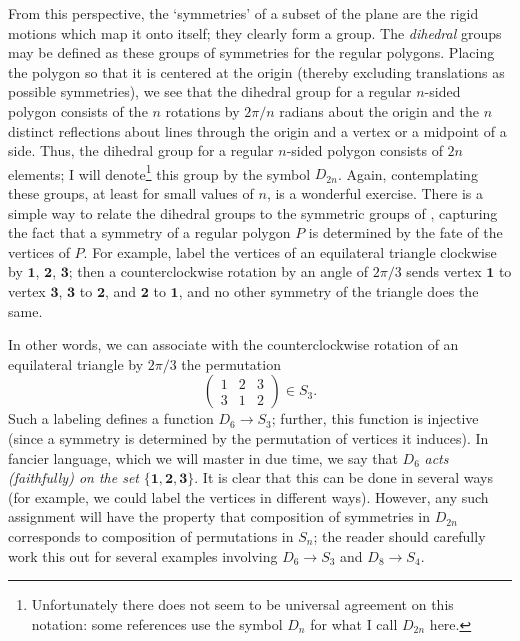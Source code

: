 From this perspective, the `symmetries' of a subset of the plane are
the rigid motions which map it onto itself; they clearly form a group.
The \textit{dihedral} groups may be defined as these groups of
symmetries for the regular polygons. Placing the polygon so that it is
centered at the origin (thereby excluding translations as possible
symmetries), we see that the dihedral group for a regular $n$-sided
polygon consists of the $n$ rotations by $2\pi/n$ radians about the
origin and the $n$ distinct reflections about lines through the origin
and a vertex or a midpoint of a side. Thus, the dihedral group for a
regular $n$-sided polygon consists of $2n$ elements; I will
denote\footnote{Unfortunately there does not seem to be universal
  agreement on this notation: some references use the symbol $D_n$ for
  what I call $D_{2n}$ here.} this group by the symbol $D_{2n}$.
Again, contemplating these groups, at least for small values of $n$,
is a wonderful exercise. There is a simple way to relate the dihedral
groups to the symmetric groups of
, capturing the fact that a
symmetry of a regular polygon $P$ is determined by the fate of the
vertices of $P$. For example, label the vertices of an equilateral
triangle clockwise by $\mathbf{1}$, $\mathbf{2}$, $\mathbf{3}$; then a
counterclockwise rotation by an angle of $2\pi/3$ sends vertex
$\mathbf{1}$ to vertex $\mathbf{3}$, $\mathbf{3}$ to $\mathbf{2}$, and
$\mathbf{2}$ to $\mathbf{1}$, and no other symmetry of the triangle
does the same.

In other words, we can associate with the counterclockwise rotation of
an equilateral triangle by $2\pi/3$ the permutation
\[
  \begin{pmatrix}1&2&3\\3&1&2\end{pmatrix} \in S_3.
\]
Such a labeling defines a function $D_6 \to S_3$; further, this
function is injective (since a symmetry is determined by the
permutation of vertices it induces). In fancier language, which we
will master in due time, we say that $D_6$ \textit{acts (faithfully)
  on the set} $\{\mathbf{1}, \mathbf{2}, \mathbf{3}\}$.  It is clear
that this can be done in several ways (for example, we could label the
vertices in different ways). However, any such assignment will have
the property that composition of symmetries in $D_{2n}$ corresponds to
composition of permutations in $S_n$; the reader should carefully work
this out for several examples involving $D_6 \to S_3$ and
$D_8 \to S_4$.

